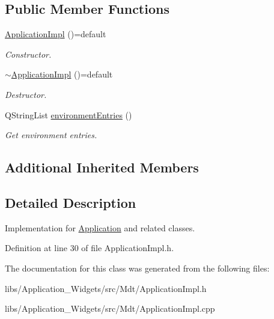 \subsection*{Public Member Functions}
\begin{DoxyCompactItemize}
\item 
\hyperlink{class_mdt_1_1_application_impl_a512c94eac0af0b0fb9ecd76af49fa473}{Application\+Impl} ()=default\hypertarget{class_mdt_1_1_application_impl_a512c94eac0af0b0fb9ecd76af49fa473}{}\label{class_mdt_1_1_application_impl_a512c94eac0af0b0fb9ecd76af49fa473}

\begin{DoxyCompactList}\small\item\em Constructor. \end{DoxyCompactList}\item 
\hyperlink{class_mdt_1_1_application_impl_aacb32f587d7f8da64472026e8cf28f3c}{$\sim$\+Application\+Impl} ()=default\hypertarget{class_mdt_1_1_application_impl_aacb32f587d7f8da64472026e8cf28f3c}{}\label{class_mdt_1_1_application_impl_aacb32f587d7f8da64472026e8cf28f3c}

\begin{DoxyCompactList}\small\item\em Destructor. \end{DoxyCompactList}\item 
Q\+String\+List \hyperlink{class_mdt_1_1_application_impl_a50deab1146432008cfed699c817dd315}{environment\+Entries} ()\hypertarget{class_mdt_1_1_application_impl_a50deab1146432008cfed699c817dd315}{}\label{class_mdt_1_1_application_impl_a50deab1146432008cfed699c817dd315}

\begin{DoxyCompactList}\small\item\em Get environment entries. \end{DoxyCompactList}\end{DoxyCompactItemize}
\subsection*{Additional Inherited Members}


\subsection{Detailed Description}
Implementation for \hyperlink{class_mdt_1_1_application}{Application} and related classes. 

Definition at line 30 of file Application\+Impl.\+h.



The documentation for this class was generated from the following files\+:\begin{DoxyCompactItemize}
\item 
libs/\+Application\+\_\+\+Widgets/src/\+Mdt/Application\+Impl.\+h\item 
libs/\+Application\+\_\+\+Widgets/src/\+Mdt/Application\+Impl.\+cpp\end{DoxyCompactItemize}
